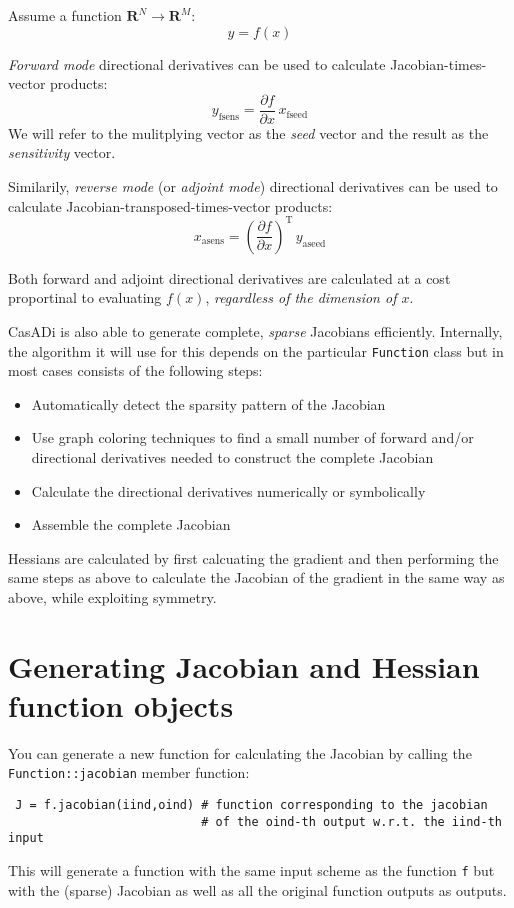 \documentclass[a4paper,12pt]{book}
\begin{document}
Assume a function $\mathbf{R}^N \rightarrow \mathbf{R}^M$:
\begin{equation}
 y = f(x)
\end{equation}

\emph{Forward mode} directional derivatives can be used to calculate Jacobian-times-vector products:
\begin{equation}
 y_{\text{fsens}} = \frac{\partial f}{\partial x} \, x_{\text{fseed}}
\end{equation}
We will refer to the mulitplying vector as the \emph{seed} vector and the result as the \emph{sensitivity} vector.

Similarily, \emph{reverse mode} (or \emph{adjoint mode}) directional derivatives can be used to calculate Jacobian-transposed-times-vector products:
\begin{equation}
 x_{\text{asens}} = \left(\frac{\partial f}{\partial x}\right)^{\text{T}} \, y_{\text{aseed}}
\end{equation}

Both forward and adjoint directional derivatives are calculated at a cost proportinal to evaluating $f(x)$, \emph{regardless of the dimension of $x$}.

CasADi is also able to generate complete, \emph{sparse} Jacobians efficiently. Internally, the algorithm it will use for this depends on the particular \texttt{Function} class but in most cases consists of the following steps:
\begin{itemize}
 \item Automatically detect the sparsity pattern of the Jacobian
 \item Use graph coloring techniques to find a small number of forward and/or directional derivatives needed to construct the complete Jacobian
 \item Calculate the directional derivatives numerically or symbolically
 \item Assemble the complete Jacobian
\end{itemize}

Hessians are calculated by first calcuating the gradient and then performing the same steps as above to calculate the Jacobian of the gradient in the same way as above, while exploiting symmetry.

\section{Generating Jacobian and Hessian function objects}
You can generate a new function for calculating the Jacobian by calling the \texttt{Function::jacobian} member function:
\begin{verbatim}
 J = f.jacobian(iind,oind) # function corresponding to the jacobian
                           # of the oind-th output w.r.t. the iind-th input
\end{verbatim}
This will generate a function with the same input scheme as the function \texttt{f} but with the (sparse) Jacobian as well as all the original function outputs as outputs.
\end{document}
